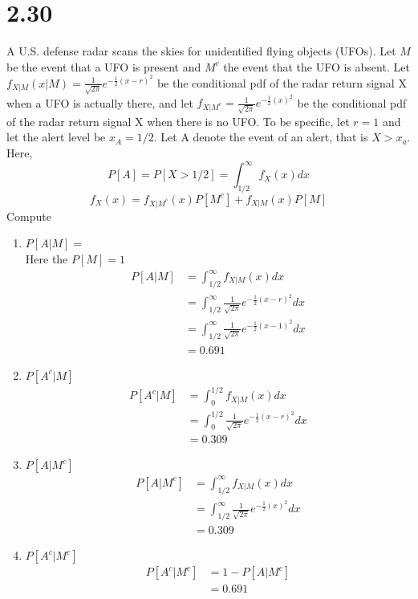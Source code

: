 \documentclass[12pt]{article}
\newcommand{\mysection}[1]{\section*{#1}}
\begin{document}
\mysection{2.30}
A U.S. defense radar scans the skies for unidentified flying objects (UFOs). Let $M$ be the event that a UFO is
present and $M^c$ the event that the UFO is absent. Let 
$f_{X|M}(x|M)=\frac{1}{\sqrt{2\pi}}e^{-\frac{1}{2}{(x-r)}^2}$ be the conditional pdf of the radar return
signal X when a UFO is actually there, and let 
$f_{X|M^c}=\frac{1}{\sqrt{2\pi}}e^{-\frac{1}{2}{(x)}^2}$ be the conditional pdf of the radar return signal X
when there is no UFO\@. To be specific, let $r=1$ and let the alert level be $x_A=1/2$. Let A denote the event
of an alert, that is ${X>x_a}$. \\
Here, 
  \[ P[A]=P[X>1/2]=\int_{1/2}^\infty f_X(x) dx \]
  \[ f_X(x)=f_{X|M^c}(x)P[M^c]+f_{X|M}(x)P[M] \]
Compute
\begin{enumerate}
  \item $P[A|M]=$\\
    Here the $P[M]=1$
    \begin{align*}
      P[A|M]&=\int_{1/2}^\infty f_{X|M}(x) dx\\
            &=\int_{1/2}^\infty \frac{1}{\sqrt{2\pi}}e^{-\frac{1}{2}{(x-r)}^2} dx\\
            &=\int_{1/2}^\infty \frac{1}{\sqrt{2\pi}}e^{-\frac{1}{2}{(x-1)}^2} dx\\
            &=0.691
    \end{align*}
  \item $P[A^c|M]$\\
    \begin{align*}
      P[A^c|M]&=\int_{0}^{1/2} f_{X|M}(x) dx\\
            &=\int_{0}^{1/2} \frac{1}{\sqrt{2\pi}}e^{-\frac{1}{2}{(x-r)}^2} dx\\
            &=0.309
    \end{align*}
  \item $P[A|M^c]$\\
    \begin{align*}
      P[A|M^c]&=\int_{1/2}^\infty f_{X|M}(x) dx\\
            &=\int_{1/2}^\infty \frac{1}{\sqrt{2\pi}}e^{-\frac{1}{2}{(x)}^2} dx\\
            &=0.309
    \end{align*}
  \item $P[A^c|M^c]$\\
    \begin{align*}
      P[A^c|M^c]&=1-P[A|M^c]\\
            &=0.691
    \end{align*}
\end{enumerate}
\newpage
\end{document}

